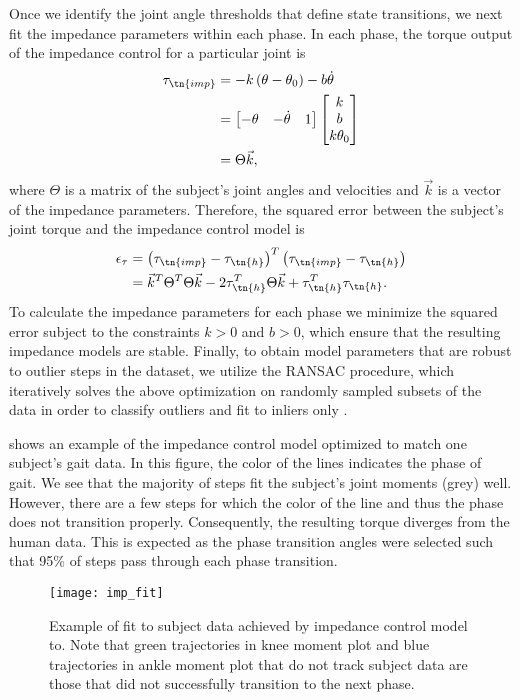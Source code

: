 Once we identify the joint angle thresholds that define state transitions, we
next fit the impedance parameters within each phase. In each phase, the torque
output of the impedance control for a particular joint is 
\begin{align}
    \tau_\tn{imp} &= -k \left( \theta - \theta_0 \right) - b \dot{\theta} \\
        &= \begin{bmatrix} -\theta & -\dot{\theta} & 1 \end{bmatrix}
            \begin{bmatrix} k \\ b \\ k \theta_0 \end{bmatrix} \\
        &= \Theta \vec{k},
\end{align}
where $\Theta$ is a matrix of the subject's joint angles and velocities and
$\vec{k}$ is a vector of the impedance parameters. Therefore, the squared error
between the subject's joint torque and the impedance control model is
\begin{align}
    \epsilon_\tau & = {\left( \tau_\tn{imp} - \tau_\tn{h} \right)}^T 
        \left( \tau_\tn{imp} - \tau_\tn{h} \right) \\
        &= \vec{k}^T \Theta^T \Theta \vec{k} - 2\tau_\tn{h}^T \Theta \vec{k} 
        + \tau_\tn{h}^T \tau_\tn{h}.
\end{align}
To calculate the impedance parameters for each phase we minimize the squared
error subject to the constraints $k>0$ and ${b > 0}$, which ensure that
the resulting impedance models are stable. Finally, to obtain model parameters
that are robust to outlier steps in the dataset, we utilize the RANSAC
procedure, which iteratively solves the above optimization on randomly sampled
subsets of the data in order to classify outliers and fit to inliers only
\citep{fischler1981random}.

 shows an example of the impedance control model
optimized to match one subject's gait data. In this figure, the color of the
lines indicates the phase of gait. We see that the majority of steps fit the
subject's joint moments (grey) well. However, there are a few steps for which
the color of the line and thus the phase does not transition properly.
Consequently, the resulting torque diverges from the human data. This is
expected as the phase transition angles were selected such that 95\% of steps
pass through each phase transition.
\begin{figure}[t]
    \centering 
    \texttt{[image: imp\_fit]}
    \caption[Example of fit to subject data achieved by impedance control
    model]{Example of fit to subject data achieved by impedance control model
    to. Note that green trajectories in knee moment plot and blue trajectories
    in ankle moment plot that do not track subject data are those that did not
    successfully transition to the next phase.}\label{fig:treadmill_imp_fit}
\end{figure}


